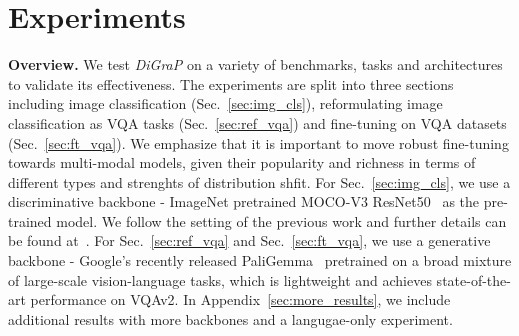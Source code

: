\section{Experiments}

\noindent \textbf{Overview.} We test \emph{DiGraP} on a variety of benchmarks, tasks and architectures to validate its effectiveness. The experiments are split into three sections including image classification (Sec.~\ref{sec:img_cls}), reformulating image classification as VQA tasks (Sec.~\ref{sec:ref_vqa}) and fine-tuning on VQA datasets (Sec.~\ref{sec:ft_vqa}). We emphasize that it is important to move robust fine-tuning towards multi-modal models, given their popularity and richness in terms of different types and strenghts of distribution shfit. For Sec.~\ref{sec:img_cls}, we use a discriminative backbone - ImageNet pretrained MOCO-V3 ResNet50~\citep{chen2021empiricalstudytrainingselfsupervised} as the pre-trained model. We follow the setting of the previous work and further details can be found at~\citet{tian_trainable_2023}. For Sec.~\ref{sec:ref_vqa} and Sec.~\ref{sec:ft_vqa}, we use a generative backbone - Google's recently released PaliGemma~\citep{beyer_paligemma_2024} pretrained on a broad mixture of large-scale vision-language tasks, which is lightweight and achieves state-of-the-art performance on VQAv2.
In Appendix~\ref{sec:more_results}, we include additional results with more backbones and a langugae-only experiment.


